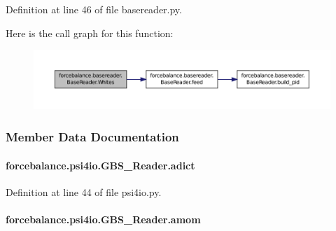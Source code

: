 Definition at line 46 of file basereader.\-py.



Here is the call graph for this function\-:\nopagebreak
\begin{figure}[H]
\begin{center}
\leavevmode
\includegraphics[width=350pt]{classforcebalance_1_1basereader_1_1BaseReader_a2819ab1e523b6ff8e7467e56e3582386_cgraph}
\end{center}
\end{figure}




\subsubsection{Member Data Documentation}
\hypertarget{classforcebalance_1_1psi4io_1_1GBS__Reader_ac42c3b29532e11a0d8d78b48347739ff}{
\paragraph[{adict}]{\setlength{\rightskip}{0pt plus 5cm}forcebalance.\-psi4io.\-G\-B\-S\-\_\-\-Reader.\-adict}}\label{classforcebalance_1_1psi4io_1_1GBS__Reader_ac42c3b29532e11a0d8d78b48347739ff}


Definition at line 44 of file psi4io.\-py.

\hypertarget{classforcebalance_1_1psi4io_1_1GBS__Reader_a322f36949ce67389f107cac80e8f5b40}{
\paragraph[{amom}]{\setlength{\rightskip}{0pt plus 5cm}forcebalance.\-psi4io.\-G\-B\-S\-\_\-\-Reader.\-amom}}\label{classforcebalance_1_1psi4io_1_1GBS__Reader_a322f36949ce67389f107cac80e8f5b40}


